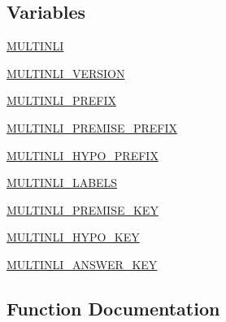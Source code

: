 \subsection*{Variables}
\begin{DoxyCompactItemize}
\item 
\hyperlink{namespaceparlai_1_1tasks_1_1multinli_1_1agents_a5edb36dd327dda4e95e5851ac53a21c9}{M\+U\+L\+T\+I\+N\+LI}
\item 
\hyperlink{namespaceparlai_1_1tasks_1_1multinli_1_1agents_ae4dafc3b412b9907c1ea0003c0965c03}{M\+U\+L\+T\+I\+N\+L\+I\+\_\+\+V\+E\+R\+S\+I\+ON}
\item 
\hyperlink{namespaceparlai_1_1tasks_1_1multinli_1_1agents_a5f414ca2c55e3b5f749a1de1de1feaf1}{M\+U\+L\+T\+I\+N\+L\+I\+\_\+\+P\+R\+E\+F\+IX}
\item 
\hyperlink{namespaceparlai_1_1tasks_1_1multinli_1_1agents_a3132ceb477434353d9fe93f8a65c89b5}{M\+U\+L\+T\+I\+N\+L\+I\+\_\+\+P\+R\+E\+M\+I\+S\+E\+\_\+\+P\+R\+E\+F\+IX}
\item 
\hyperlink{namespaceparlai_1_1tasks_1_1multinli_1_1agents_a8f567fea83ae0a1cb7a20db37c77092e}{M\+U\+L\+T\+I\+N\+L\+I\+\_\+\+H\+Y\+P\+O\+\_\+\+P\+R\+E\+F\+IX}
\item 
\hyperlink{namespaceparlai_1_1tasks_1_1multinli_1_1agents_aa295616fe413f43e16ce2855796b1bf4}{M\+U\+L\+T\+I\+N\+L\+I\+\_\+\+L\+A\+B\+E\+LS}
\item 
\hyperlink{namespaceparlai_1_1tasks_1_1multinli_1_1agents_ad02a57fe83d87c4525b8d91c3a8df8e4}{M\+U\+L\+T\+I\+N\+L\+I\+\_\+\+P\+R\+E\+M\+I\+S\+E\+\_\+\+K\+EY}
\item 
\hyperlink{namespaceparlai_1_1tasks_1_1multinli_1_1agents_ac377293b5033566948dd0daa70bf0933}{M\+U\+L\+T\+I\+N\+L\+I\+\_\+\+H\+Y\+P\+O\+\_\+\+K\+EY}
\item 
\hyperlink{namespaceparlai_1_1tasks_1_1multinli_1_1agents_a3bbf82c8bb9c3e9e54fc8503f5eb74e0}{M\+U\+L\+T\+I\+N\+L\+I\+\_\+\+A\+N\+S\+W\+E\+R\+\_\+\+K\+EY}
\end{DoxyCompactItemize}


\subsection{Function Documentation}
\mbox{\label{namespaceparlai_1_1tasks_1_1multinli_1_1agents_a4fa2cb0ba1ed745336ad8bceed36b841}} 
